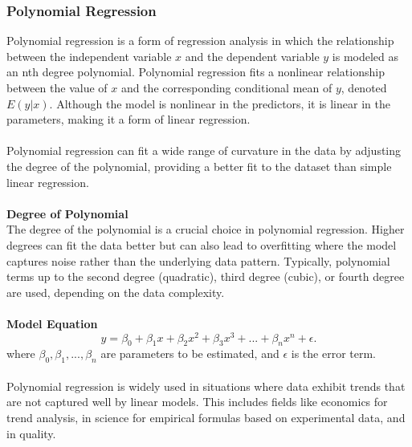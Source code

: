 \documentclass[12pt]{article}
\begin{document}
\subsubsection{Polynomial Regression}
Polynomial regression is a form of regression analysis in which the relationship between
the independent variable \(x\) and the dependent variable \(y\) is modeled as an nth degree
polynomial. Polynomial regression fits a nonlinear relationship between the value
of \(x\) and the corresponding conditional mean of \(y\), denoted \(E(y|x)\). Although
the model is nonlinear in the predictors, it is linear in the parameters, making it a
form of linear regression.\\
\\Polynomial regression can fit a wide range of curvature in the data by adjusting
the degree of the polynomial, providing a better fit to the dataset than simple
linear regression.\\
\\
\textbf{Degree of Polynomial}\\
The degree of the polynomial is a crucial choice in polynomial regression. Higher degrees
can fit the data better but can also lead to overfitting where the model captures noise
rather than the underlying data pattern. Typically, polynomial terms up to the second
degree (quadratic), third degree (cubic), or fourth degree are used, depending on the data
complexity.\\
\\
\textbf{Model Equation}
\begin{equation}
   y = \beta_0 + \beta_1x + \beta_2x^2 + \beta_3x^3 + ... + \beta_nx^n + \epsilon.
\end{equation}
where \( \beta_0, \beta_1, ..., \beta_n \) are parameters to be estimated,
and \( \epsilon \) is the error term.\\
\\
Polynomial regression is widely used in situations where data exhibit trends that are
not captured well by linear models. This includes fields like economics for trend
analysis, in science for empirical formulas based on experimental data, and in quality.
\end{document}
